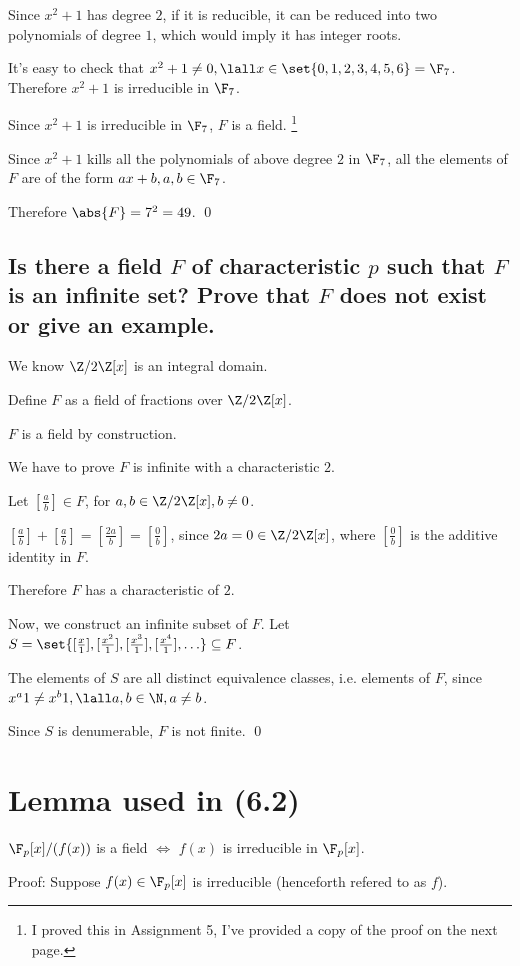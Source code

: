         Since $x^2 + 1$ has degree $2$, if it is reducible, it can be reduced into
        two polynomials of degree $1$, which would imply it has integer roots.

        It's easy to check that $x^2 + 1 \neq 0, \lall x \in \set{0,1,2,3,4,5,6} = \F_7$.
        Therefore $x^2 + 1 $ is irreducible in $\F_7$.

        Since $x^2 + 1$ is irreducible in $\F_7$, $F$ is a field.
        \footnote{I proved this in Assignment 5, 
            I've provided a copy of the proof on the next page.}

        Since $x^2 + 1$ kills all the polynomials of above degree $2$ in $\F_7$,
        all the elements of $F$ are of the form $ax + b, a,b \in \F_7$.

        Therefore $\abs{F} = 7^2 = 49$.
        \qed

    \subsection[(iii)]{
        Is there a field $F$ of characteristic $p$ such that $F$ is an infinite set?
        Prove that $F$ does not exist or give an example.
    }
        We know $\Z/2\Z[x]$ is an integral domain.

        Define $F$ as a field of fractions over $\Z/2\Z[x]$.

        $F$ is a field by construction.

        We have to prove $F$ is infinite with a characteristic $2$.

        Let $[\frac{a}{b}]\in F$, for $a,b\in \Z/2\Z[x], b \neq 0$.

        $[\frac{a}{b}] + [\frac{a}{b}] = [\frac{2a}{b}] = [\frac{0}{b}]$, since $2a = 0 \in \Z/2\Z[x]$,
        where $[\frac{0}{b}]$ is the additive identity in $F$.

        Therefore $F$ has a characteristic of $2$.

        Now, we construct an infinite subset of $F$.
        Let $S = \set{[\frac{x}{1}],[\frac{x^2}{1}],[\frac{x^3}{1}],[\frac{x^4}{1}],\hdots} \subseteq F$.

        The elements of $S$ are all distinct equivalence classes, i.e. elements of $F$,
        since $x^a 1 \neq x^b 1, \lall a,b\in \N, a\neq b$.

        Since $S$ is denumerable,
        $F$ is not finite.
        \qed



\section*{Lemma used in (6.2)}
    \begin{lemma}
        $\F_p[x] / (f(x))$ is a field $\iff$ $f(x)$ is irreducible in $\F_p[x]$.
    \end{lemma}
        Proof:
        Suppose $f(x) \in \F_p[x]$ is irreducible (henceforth refered to as $f$).

